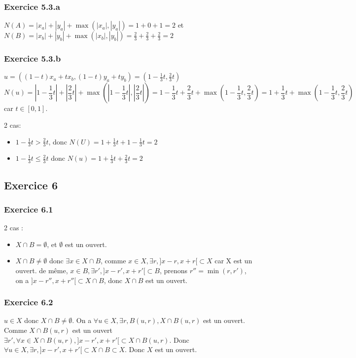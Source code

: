\documentclass[]{book}
\theoremstyle{definition}
\begin{document}
\subsubsection*{Exercice 5.3.a}
$N(A) = |x_a|+|y_a| + \max(|x_a|,|y_a|) = 1 + 0 + 1 = 2$ et $N(B) = |x_b|+|y_b| + \max(|x_b|,|y_b|) = \frac{2}{3} + \frac{2}{3} + \frac{2}{3} = 2$

\subsubsection*{Exercice 5.3.b}
$u=((1-t)x_a+tx_b, (1-t)y_a+ty_b) = (1-\frac{1}{3}t, \frac{2}{3}t)$
$$N(u) = |1-\frac{1}{3}t| + |\frac{2}{3}t| + \max(|1-\frac{1}{3}t|, |\frac{2}{3}t|) =  1-\frac{1}{3}t + \frac{2}{3}t + \max(1-\frac{1}{3}t, \frac{2}{3}t) = 
1+\frac{1}{3}t + \max(1-\frac{1}{3}t, \frac{2}{3}t)$$ car $t \in [0,1]$.

2 cas:
\begin{itemize}
\item $1-\frac{1}{3}t > \frac{2}{3}t$, donc $N(U)= 1+\frac{1}{3}t + 1-\frac{1}{3}t = 2$
\item $1-\frac{1}{3}t \leq \frac{2}{3}t$ donc $N(u) = 1+\frac{1}{3}t + \frac{2}{3}t = 2$
\end{itemize}


\subsection*{Exercice 6}
\subsubsection*{Exercice 6.1}
2 cas :
\begin{itemize}
\item $X \cap B = \emptyset$, et $\emptyset$ est un ouvert.
\item $X \cap B \neq \emptyset$ donc $\exists x \in X \cap B$, comme $x \in X, \exists r, ]x-r, x+r[ \subset X$ car X est un ouvert. de m\^eme, $x \in B, \exists r', ]x-r', x+r'[ \subset B$, prenons $r'' = \min(r,r')$, on a $]x-r'', x+r''[ \subset X \cap B$, donc $X \cap B$ est un ouvert.
\end{itemize}

\subsubsection*{Exercice 6.2}
$u \in X$ donc $X \cap B \neq \emptyset$. On a $\forall u \in X, \exists r, B(u,r), X \cap B(u,r)$ est un ouvert. Comme $X \cap B(u,r)$ est un ouvert $\exists r', \forall x \in X \cap B(u,r), ]x-r', x+r'[ \subset X \cap B(u,r)$. Donc $\forall u \in X, \exists r, ]x-r', x+r'[ \subset X \cap B \subset X$. Donc $X$ est un ouvert. 
\end{document}
